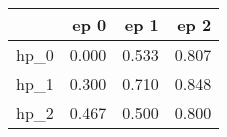 \begin{tabular}{lrrr}
\toprule
{} &   ep 0 &   ep 1 &   ep 2 \\
\midrule
hp\_0 &  0.000 &  0.533 &  0.807 \\
hp\_1 &  0.300 &  0.710 &  0.848 \\
hp\_2 &  0.467 &  0.500 &  0.800 \\
\bottomrule
\end{tabular}
